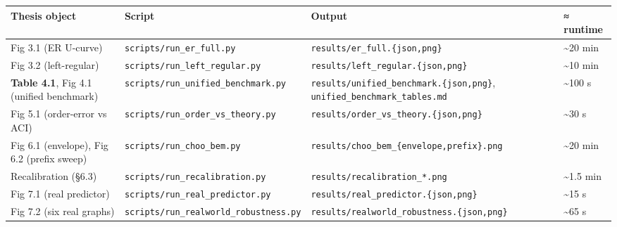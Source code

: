 {\def\LTcaptype{none} %
\begin{longtable}[]{@{}
  >{\raggedright\arraybackslash}p{}
  >{\raggedright\arraybackslash}p{}
  >{\raggedright\arraybackslash}p{}
  >{\raggedright\arraybackslash}p{}@{}}
\toprule\noalign{}
\begin{minipage}[b]{\linewidth}\raggedright
Thesis object
\end{minipage} & \begin{minipage}[b]{\linewidth}\raggedright
Script
\end{minipage} & \begin{minipage}[b]{\linewidth}\raggedright
Output
\end{minipage} & \begin{minipage}[b]{\linewidth}\raggedright
≈ runtime
\end{minipage} \\
\midrule\noalign{}
\endhead
\bottomrule\noalign{}
\endlastfoot
Fig 3.1 (ER U-curve) & \texttt{scripts/run\_er\_full.py} & \texttt{results/er\_full.\{json,png\}} & \textasciitilde20 min \\
Fig 3.2 (left-regular) & \texttt{scripts/run\_left\_regular.py} & \texttt{results/left\_regular.\{json,png\}} & \textasciitilde10 min \\
\textbf{Table 4.1}, Fig 4.1 (unified benchmark) & \texttt{scripts/run\_unified\_benchmark.py} & \texttt{results/unified\_benchmark.\{json,png\}}, \texttt{unified\_benchmark\_tables.md} & \textasciitilde100 s \\
Fig 5.1 (order-error vs ACI) & \texttt{scripts/run\_order\_vs\_theory.py} & \texttt{results/order\_vs\_theory.\{json,png\}} & \textasciitilde30 s \\
Fig 6.1 (envelope), Fig 6.2 (prefix sweep) & \texttt{scripts/run\_choo\_bem.py} & \texttt{results/choo\_bem\_\{envelope,prefix\}.png} & \textasciitilde20 min \\
Recalibration (§6.3) & \texttt{scripts/run\_recalibration.py} & \texttt{results/recalibration\_*.png} & \textasciitilde1.5 min \\
Fig 7.1 (real predictor) & \texttt{scripts/run\_real\_predictor.py} & \texttt{results/real\_predictor.\{json,png\}} & \textasciitilde15 s \\
Fig 7.2 (six real graphs) & \texttt{scripts/run\_realworld\_robustness.py} & \texttt{results/realworld\_robustness.\{json,png\}} & \textasciitilde65 s \\

\end{longtable}}
